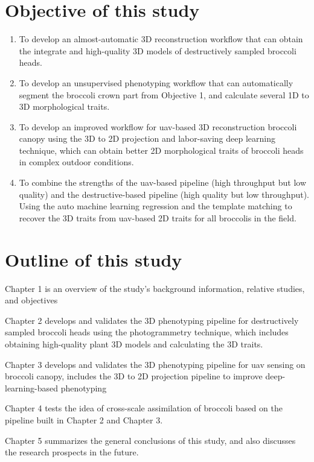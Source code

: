 \section{Objective of this study}

\begin{enumerate}
    \item To develop an almost-automatic 3D reconstruction workflow that can obtain the integrate and high-quality 3D models of destructively sampled broccoli heads.
    \item To develop an unsupervised phenotyping workflow that can automatically segment the broccoli crown part from Objective 1, and calculate several 1D to 3D morphological traits.
    \item To develop an improved workflow for \gls{uav}-based 3D reconstruction broccoli canopy using the 3D to 2D projection and labor-saving deep learning technique, which can obtain better 2D morphological traits of broccoli heads in complex outdoor conditions.
    \item To combine the strengths of the \gls{uav}-based pipeline (high throughput but low quality) and the destructive-based pipeline (high quality but low throughput). Using the auto machine learning regression and the template matching to recover the 3D traits from \gls{uav}-based 2D traits for all broccolis in the field.

\end{enumerate}


\section{Outline of this study}

Chapter 1 is an overview of the study's background information, relative studies, and objectives

Chapter 2 develops and validates the 3D phenotyping pipeline for destructively sampled broccoli heads using the photogrammetry technique, which includes obtaining high-quality plant 3D models and calculating the 3D traits.


Chapter 3 develops and validates the 3D phenotyping pipeline for \gls{uav} sensing on broccoli canopy, includes the 3D to 2D projection pipeline to improve deep-learning-based phenotyping

Chapter 4 tests the idea of cross-scale assimilation of broccoli based on the pipeline built in Chapter 2 and Chapter 3.

Chapter 5 summarizes the general conclusions of this study, and also discusses the research prospects in the future.